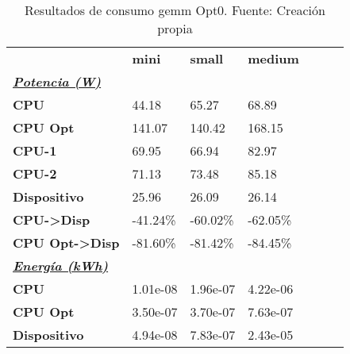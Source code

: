 \begin{table}[H]
    \centering
    \begin{tabular}{lllllll}
    \rowcolor[HTML]{DAE8FC} \ & \textbf{mini} & \textbf{	small} & \textbf{	medium} \\
    \cellcolor[HTML]{DAE8FC} \textbf{\textbf{{\emph{{\underline{{Potencia (W)}}}}}}} &  & 	 & 	 \\
    \rowcolor[HTML]{EFEFEF} \cellcolor[HTML]{DAE8FC} \textbf{CPU} & 44.18 & 	65.27 & 	68.89 \\
    \cellcolor[HTML]{DAE8FC} \textbf{CPU Opt} & 141.07 & 	140.42 & 	168.15 \\
    \rowcolor[HTML]{EFEFEF} \cellcolor[HTML]{DAE8FC} \textbf{\quad CPU-1} & 69.95 & 	66.94 & 	82.97 \\
    \cellcolor[HTML]{DAE8FC} \textbf{\quad CPU-2} & 71.13 & 	73.48 & 	85.18 \\
    \rowcolor[HTML]{EFEFEF} \cellcolor[HTML]{DAE8FC} \textbf{Dispositivo} & 25.96 & 	26.09 & 	26.14 \\
    \cellcolor[HTML]{DAE8FC} \textbf{CPU->Disp} & -41.24\% & 	-60.02\% & 	-62.05\% \\
    \rowcolor[HTML]{EFEFEF} \cellcolor[HTML]{DAE8FC} \textbf{CPU Opt->Disp} & -81.60\% & 	-81.42\% & 	-84.45\% \\
    \cellcolor[HTML]{DAE8FC} \textbf{\textbf{{\emph{{\underline{{Energía (kWh)}}}}}}} &  & 	 & 	 \\
    \rowcolor[HTML]{EFEFEF} \cellcolor[HTML]{DAE8FC} \textbf{CPU} & 1.01e-08 & 	1.96e-07 & 	4.22e-06 \\
    \cellcolor[HTML]{DAE8FC} \textbf{CPU Opt} & 3.50e-07 & 	3.70e-07 & 	7.63e-07 \\
    \rowcolor[HTML]{EFEFEF} \cellcolor[HTML]{DAE8FC} \textbf{Dispositivo} & 4.94e-08 & 	7.83e-07 & 	2.43e-05 \\
    \end{tabular}
    \caption[Resultados de consumo gemm Opt0]{{Resultados de consumo gemm Opt0. Fuente: Creación propia}}
    \label{table_test_gemm_Opt0_hw_powerResults}
\end{table}
